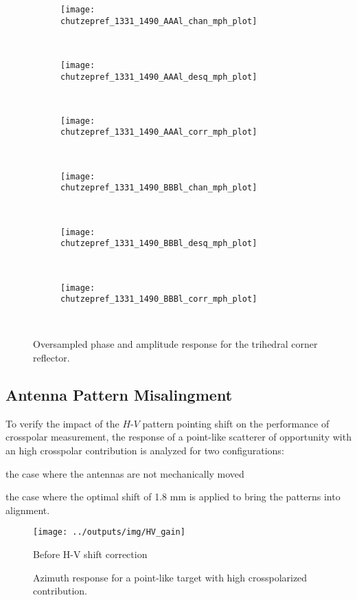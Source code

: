 \begin{figure*}[h]
	\begin{subfigure}[b]{0.6\columnwidth}
		\centering
		\texttt{[image: \\chutzepref\_1331\_1490\_AAAl\_chan\_mph\_plot]}
		\label{fig:tcr_mph:HH_uncorr}
	\end{subfigure}~
	\begin{subfigure}[b]{0.6\columnwidth}
		\centering
		\texttt{[image: \\chutzepref\_1331\_1490\_AAAl\_desq\_mph\_plot]}
		\label{fig:tcr_mph:HH_corr}
	\end{subfigure}~
	\begin{subfigure}[b]{0.6\columnwidth}
		\centering
		\texttt{[image: \\chutzepref\_1331\_1490\_AAAl\_corr\_mph\_plot]}
		\label{fig:tcr_mph:HH_corr_ph}
	\end{subfigure}\\
	\begin{subfigure}[b]{0.6\columnwidth}
		\centering
		\texttt{[image: \\chutzepref\_1331\_1490\_BBBl\_chan\_mph\_plot]}
		\label{fig:tcr_mph:VV_uncorr}
	\end{subfigure}~
	\begin{subfigure}[b]{0.6\columnwidth}
		\centering
		\texttt{[image: \\chutzepref\_1331\_1490\_BBBl\_desq\_mph\_plot]}
		\label{fig:tcr_mph:VV_corr}
	\end{subfigure}~
	\begin{subfigure}[b]{0.6\columnwidth}
		\centering
		\texttt{[image: \\chutzepref\_1331\_1490\_BBBl\_corr\_mph\_plot]}
		\label{fig:tcr_mph:VV_corr_ph}
	\end{subfigure}~

	\caption{Oversampled phase and amplitude response for the trihedral corner reflector.}
	\label{fig:tcr_mph}
\end{figure*}
\subsection{Antenna Pattern Misalingment}
To verify the impact of the $H$-$V$ pattern pointing shift on the performance of crosspolar measurement, the response of a point-like scatterer of opportunity with an high crosspolar contribution is analyzed for two configurations: \begin{enumerate*}\item the case where the antennas are not mechanically moved \item the case where the optimal shift of 1.8 mm is applied to bring the patterns into alignment.
\end{enumerate*}
\begin{figure}[ht]
	\centering
	\texttt{[image: ../outputs/img/HV\_gain]}
	\caption{Before H-V shift correction}
	\label{fig:hv_power:uncalibrated}
	\caption{Azimuth response for a point-like target with high crosspolarized contribution.}
	\label{fig:hv_power}
\end{figure}

